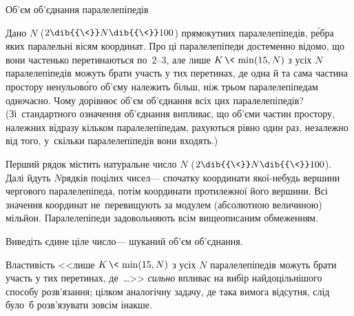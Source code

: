 \begin{problemAllDefault}{Об'єм об'єднання паралелепіпедів}

{
Дано $N$ ($2\dib{{\<}}N\dib{{\<}}100$) прямокутних паралелепіпедів, р\'{е}бра  яких пара\-ле\-льні вісям координат. Про ці паралелепіпеди достеменно відомо, що вони частенько перетинаються по~\mbox{2--3}, але лише ${K\,{\<}\,\min(15,N)}$ з усіх $N$ паралелепіпедів можуть брати участь у тих перетинах, де одна й та сама частина простору нену\-льо\-в\'{о}го об'єму належить більш, ніж трьом паралелепіпедам одночасно. Чому дорівнює об'єм об'єднання всіх цих паралелепіпедів? (Зі~стандартного означення об'єднання випливає, що об'єми частин простору, належних відразу кільком паралелепіпедам, рахуються рівно один раз, незалежно від того, у~скільки паралелепіпедів вони входять.)



\InputFile 
Перший рядок містить натуральне число $N$ ($2\dib{{\<}}N\dib{{\<}}100$). Далі йдуть $N$\nolinebreak[3] рядків по\nolinebreak[3] цілих чисел\nolinebreak[3] --- спочатку координати якої-небудь вершини чергового паралелепіпеда, потім координати протилежної його вершини. Всі значення координат не~перевищують за модулем (абсолютною величиною) мільйон. Паралелепіпеди задовольняють всім вищеописаним обмеженням.

\OutputFile 
Виведіть єдине ціле число\nolinebreak[3] --- шуканий об'єм об'єднання.

\Note
Властивість <<лише ${K\,{\<}\,\min(15,N)}$ з усіх $N$ паралелепіпедів можуть брати участь у тих перетинах, де~\dots>> \emph{сильно} впливає на вибір найдоцільнішого способу розв'язання; цілком аналогічну задачу, де така вимога відсутня, слід було~б розв'язувати зовсім інакше.

}

\end{problemAllDefault}

